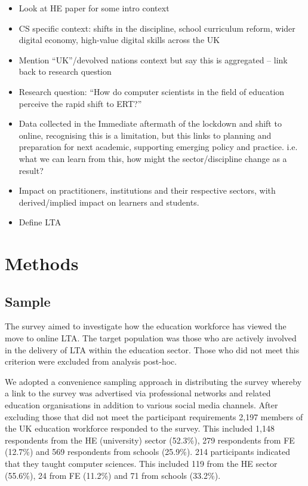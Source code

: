 \documentclass[sigconf]{acmart}
\begin{document}
\begin{itemize}
\item Look at HE paper for some intro context
\item CS specific context: shifts in the discipline, school curriculum
reform, wider digital economy, high-value digital skills across the UK
\item Mention “UK”/devolved nations context but say this is aggregated
– link back to research question
\item Research question: “How do computer scientists in the field of
education perceive the rapid shift to ERT?”
\item Data collected in the Immediate aftermath of the lockdown and
shift to online, recognising this is a limitation, but this links to
planning and preparation for next academic, supporting emerging policy
and practice. i.e. what we can learn from this, how might the
sector/discipline change as a result?
\item Impact on practitioners, institutions and their respective
sectors, with derived/implied impact on learners and students.
\item Define LTA
\end{itemize}

\section{Methods}\label{methods}

\subsection{Sample}

The survey aimed to investigate how the education workforce has viewed
the move to online LTA. The target population was those who are
actively involved in the delivery of LTA within the education
sector. Those who did not meet this criterion were excluded from
analysis post-hoc.

We adopted a convenience sampling approach in distributing the survey
whereby a link to the survey was advertised via professional networks
and related education organisations in addition to various social
media channels. After excluding those that did not meet the
participant requirements 2,197 members of the UK education workforce
responded to the survey. This included 1,148 respondents from the HE
(university) sector (52.3\%), 279 respondents from FE (12.7\%) and 569
respondents from schools (25.9\%). 214 participants indicated that
they taught computer sciences. This included 119 from the HE sector
(55.6\%), 24 from FE (11.2\%) and 71 from schools (33.2\%).
\end{document}

